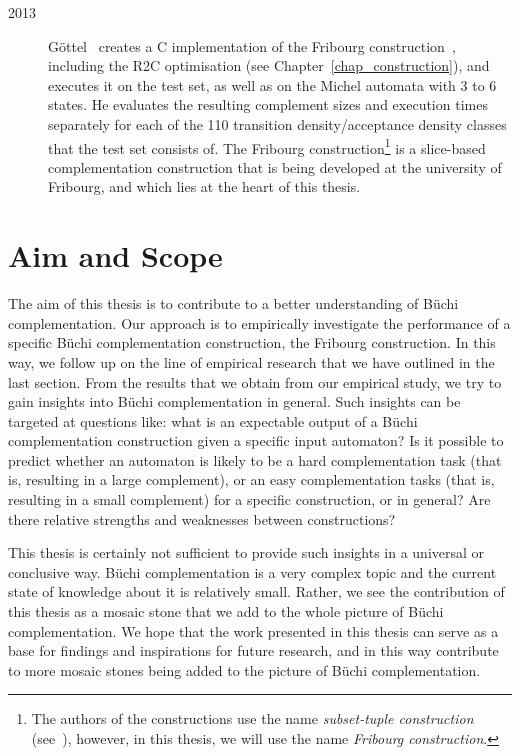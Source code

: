 {\begin{description}
\item[2013] Göttel~\cite{2013_bsc_goettel} creates a C implementation of the Fribourg construction~\cite{2014_joel_ulrich}, including the R2C optimisation (see Chapter~\ref{chap_construction}), and executes it on the \goal{} test set, as well as on the Michel automata with 3 to 6 states. He evaluates the resulting complement sizes and execution times separately for each of the 110 transition density/acceptance density classes that the \goal{} test set consists of. The Fribourg construction\footnote{The authors of the constructions use the name \textit{subset-tuple construction} (see~\cite{2014_joel_ulrich}), however, in this thesis, we will use the name \textit{Fribourg construction}.} is a slice-based complementation construction that is being developed at the university of Fribourg, and which lies at the heart of this thesis.
\end{description}}


\section{Aim and Scope}
\label{1_aim_scope}
The aim of this thesis is to contribute to a better understanding of Büchi complementation. Our approach is to empirically investigate the performance of a specific Büchi complementation construction, the Fribourg construction. In this way, we follow up on the line of empirical research that we have outlined in the last section. From the results that we obtain from our empirical study, we try to gain insights into Büchi complementation in general. Such insights can be targeted at questions like: what is an expectable output of a Büchi complementation construction given a specific input automaton? Is it possible to predict whether an automaton is likely to be a hard complementation task (that is, resulting in a large complement), or an easy complementation tasks (that is, resulting in a small complement) for a specific construction, or in general? Are there relative strengths and weaknesses between constructions?

This thesis is certainly not sufficient to provide such insights in a universal or conclusive way. Büchi complementation is a very complex topic and the current state of knowledge about it is relatively small. Rather, we see the contribution of this thesis as a mosaic stone that we add to the whole picture of Büchi complementation. We hope that the work presented in this thesis can serve as a base for findings and inspirations for future research, and in this way contribute to more mosaic stones being added to the picture of Büchi complementation.

